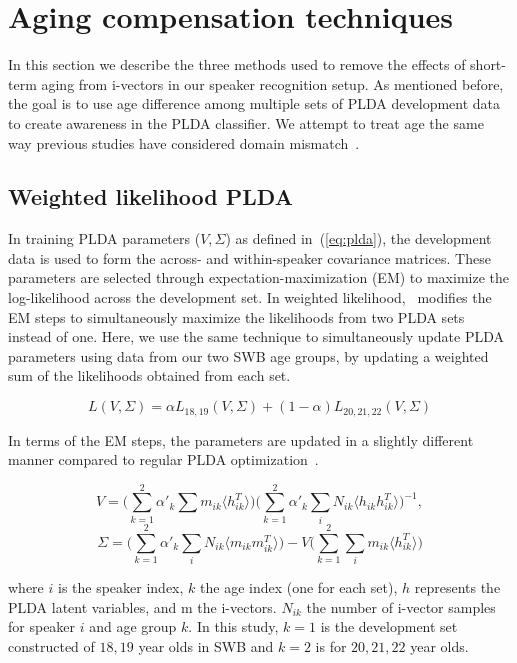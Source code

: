 \documentclass[a4paper]{article}
\begin{document}
\section{Aging compensation techniques}
\label{sec:adaptation}
In this section we describe the three methods used to remove the effects of short-term aging from i-vectors in our speaker recognition setup. As mentioned before, the goal is to use age difference among multiple sets of PLDA development data to create awareness in the PLDA classifier. We attempt to treat age the same way previous studies have considered domain mismatch~\cite{garcia2014supervised}. 

\subsection{Weighted likelihood PLDA}
In training PLDA parameters ($V,\Sigma$) as defined in~(\ref{eq:plda}), the development data is used to form the across- and within-speaker covariance matrices. These parameters are selected through expectation-maximization (EM) to maximize the log-likelihood across the development set. In weighted likelihood,~\cite{garcia2014supervised} modifies the EM steps to simultaneously maximize the likelihoods from two PLDA sets instead of one. Here, we use the same technique to simultaneously update PLDA parameters using data from our two SWB age groups, by updating a weighted sum of the likelihoods obtained from each set. 

\begin{equation}
\label{eq:wlPLDA}
L(V,\Sigma) = \alpha L_{18,19}(V,\Sigma) + (1-\alpha) L_{20,21,22}(V,\Sigma) 
\end{equation}

In terms of the EM steps, the parameters are updated in a slightly different manner compared to regular PLDA optimization~\cite{garcia2014supervised}.

\begin{equation}
\label{eq:wlPLDA-V}
V = \big ( \sum_{k=1}^2\alpha'_k\sum{m_{ik}\langle h_{ik}^T\rangle}\big ) \big ( \sum_{k=1}^2 \alpha'_k \sum_i N_{ik} \langle h_{ik}h_{ik}^T\rangle\big )^{-1},
\end{equation}
\begin{equation}
\label{eq:wlPLDA-S}
\Sigma = \big (  \sum_{k=1}^2 \alpha'_k \sum_i N_{ik} \langle m_{ik}m_{ik}^T\rangle \big ) - V\big ( \sum_{k=1}^2 \sum_i m_{ik}\langle h_{ik}^T\rangle\big )
\end{equation}
  
where $i$ is the speaker index, $k$ the age index (one for each set), $h$ represents the PLDA latent variables, and m the i-vectors. $N_{ik}$ the number of i-vector samples for speaker $i$ and age group $k$. In this study, $k = 1$ is the development set constructed of $18,19$ year olds in SWB and $k=2$ is for $20,21,22$ year olds.  
\end{document}
